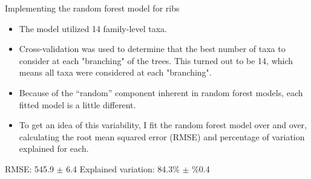 \documentclass{beamer}
\begin{document}
\begin{frame}{Implementing the random forest model for ribs}

  \begin{itemize}
  \item The model utilized 14 family-level taxa.
  \item Cross-validation was used to determine that the best number of
    taxa to consider at each "branching" of the trees.  This turned out to be
    14, which means all taxa were considered at each "branching".
  \end{itemize}

  \vspace{0.1in}

  \begin{itemize}
  \item Because of the ``random'' component inherent in random forest
    models, each fitted model is a little different.
  \item To get an idea of this variability, I fit the random forest
    model over and over, calculating the root mean squared error
    (RMSE) and percentage of variation explained for each.
  \end{itemize}

  \vspace{0.1in}
  
  \noindent RMSE: 545.9 $\pm$ 6.4 \hspace{0.2in}  Explained variation: 84.3\% $\pm$ \%0.4

\end{frame}
\end{document}

